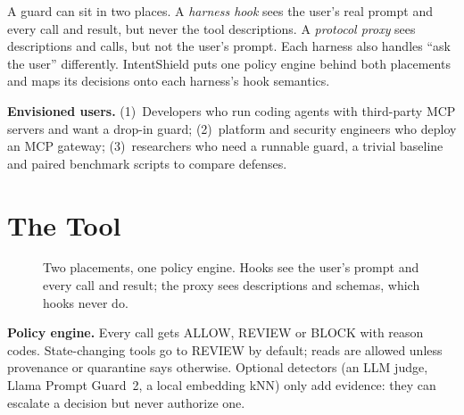 \documentclass[10pt,conference]{IEEEtran}
\newcommand{\tool}{IntentShield\xspace}
\begin{document}
A guard can sit in two places. A \emph{harness hook} sees the user's real prompt and every call and
result, but never the tool descriptions. A \emph{protocol proxy} sees descriptions and calls, but not
the user's prompt. Each harness also handles ``ask the user'' differently. \tool puts one policy
engine behind both placements and maps its decisions onto each harness's hook semantics.

\textbf{Envisioned users.} (1)~Developers who run coding agents with third-party MCP servers and want
a drop-in guard; (2)~platform and security engineers who deploy an MCP gateway; (3)~researchers who
need a runnable guard, a trivial baseline and paired benchmark scripts to compare defenses.

\section{The Tool}
\begin{figure}[t]
\centering
{}
\caption{Two placements, one policy engine. Hooks see the user's prompt and every call and result;
the proxy sees descriptions and schemas, which hooks never do.}
\label{fig:arch}
\end{figure}

\textbf{Policy engine.} Every call gets ALLOW, REVIEW or BLOCK with reason codes. State-changing
tools go to REVIEW by default; reads are allowed unless provenance or quarantine says otherwise.
Optional detectors (an LLM judge, Llama Prompt Guard~2, a local embedding kNN) only add evidence:
they can escalate a decision but never authorize one.
\end{document}
